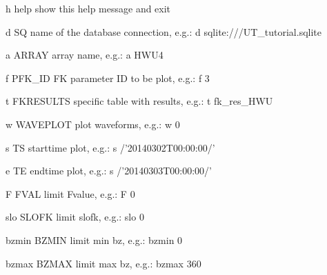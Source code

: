 \documentclass[letterpaper,10pt,english]{sphinxmanual}
\begin{document}
\begin{DUlineblock}{0em}
\item[] \sphinxhyphen{}h \textendash{}help    show this help message and exit
\item[] \sphinxhyphen{}d SQ        name of the database connection, e.g.: \sphinxhyphen{}d sqlite:///UT\_tutorial.sqlite
\item[] \sphinxhyphen{}a ARRAY     array name, e.g.: \sphinxhyphen{}a HWU4
\item[] \sphinxhyphen{}f PFK\_ID    FK parameter ID to be plot, e.g.: \sphinxhyphen{}f 3
\item[] \sphinxhyphen{}t FKRESULTS specific table with results, e.g.: \sphinxhyphen{}t fk\_res\_HWU
\item[] \sphinxhyphen{}w WAVEPLOT  plot waveforms, e.g.: \sphinxhyphen{}w 0
\item[] \sphinxhyphen{}s TS        starttime plot, e.g.: \sphinxhyphen{}s /’2014\sphinxhyphen{}03\sphinxhyphen{}02T00:00:00/’
\item[] \sphinxhyphen{}e TE        endtime plot, e.g.: \sphinxhyphen{}s /’2014\sphinxhyphen{}03\sphinxhyphen{}03T00:00:00/’
\item[] \sphinxhyphen{}F FVAL      limit Fvalue, e.g.: \sphinxhyphen{}F 0
\item[] \sphinxhyphen{}slo SLOFK   limit slofk, e.g.: \sphinxhyphen{}slo 0
\item[] \sphinxhyphen{}bzmin BZMIN limit min bz, e.g.: \sphinxhyphen{}bzmin 0
\item[] \sphinxhyphen{}bzmax BZMAX limit max bz, e.g.: \sphinxhyphen{}bzmax 360
\end{DUlineblock}

\begin{sphinxVerbatim}[commandchars=\\\{\}]
 \PYG{p}{[}\PYG{p}{]}       \PYG{p}{[} \PYG{p}{]} \PYG{p}{[} \PYG{p}{]} \PYG{p}{[} \PYG{p}{]} \PYG{p}{[} \PYG{p}{]} \PYG{p}{[} \PYG{p}{]} \PYG{p}{[} \PYG{p}{]} \PYG{p}{[} \PYG{p}{]} \PYG{p}{[} \PYG{p}{]}
\end{sphinxVerbatim}
\end{document}
